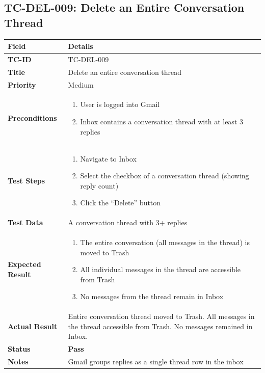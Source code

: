 \documentclass[12pt,a4paper]{article}
\begin{document}
\subsection{TC-DEL-009: Delete an Entire Conversation Thread}

\begin{longtable}{|L{3.5cm}|L{11.5cm}|}
\hline
{}\textbf{Field} & \textbf{Details} \\
\hline
\textbf{TC-ID}           & TC-DEL-009 \\
\hline
\textbf{Title}           & Delete an entire conversation thread \\
\hline
\textbf{Priority}        & Medium \\
\hline
\textbf{Preconditions}   & \begin{enumerate}[noitemsep,topsep=0pt]
                              \item User is logged into Gmail
                              \item Inbox contains a conversation thread with at least 3 replies
                            \end{enumerate} \\
\hline
\textbf{Test Steps}      & \begin{enumerate}[noitemsep,topsep=0pt]
                              \item Navigate to Inbox
                              \item Select the checkbox of a conversation thread (showing reply count)
                              \item Click the ``Delete'' button
                            \end{enumerate} \\
\hline
\textbf{Test Data}       & A conversation thread with 3+ replies \\
\hline
\textbf{Expected Result} & \begin{enumerate}[noitemsep,topsep=0pt]
                              \item The entire conversation (all messages in the thread) is moved to Trash
                              \item All individual messages in the thread are accessible from Trash
                              \item No messages from the thread remain in Inbox
                            \end{enumerate} \\
\hline
\textbf{Actual Result}   & Entire conversation thread moved to Trash. All messages in the thread accessible from Trash. No messages remained in Inbox. \\
\hline
\textbf{Status}          & \textcolor{passgreen}{\textbf{Pass}} \\
\hline
\textbf{Notes}           & Gmail groups replies as a single thread row in the inbox \\
\hline
\end{longtable}
\end{document}
